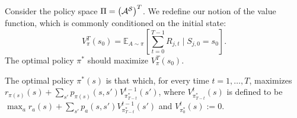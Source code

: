 \documentclass[11pt]{article}
\begin{document}
Consider the policy space $\Pi = \left(\mathcal{A}^{\mathcal{S}}\right)^{T}$. We redefine our notion of the value function, which is commonly conditioned on the initial state:
\begin{equation}
	\label{eq:valuefcn}
	V_{\pi}^{T}\left(s_{0}\right) = \mathbb{E}_{A\sim\pi}\left[\sum_{t=0}^{T-1} R_{j,t} \mid S_{j,0} = s_{0}\right].
\end{equation}
The optimal policy $\pi^{*}$ should maximize $V_{\pi}^{T}(s_{0})$.

\begin{proposition}
	The optimal policy $\pi^*(s)$ is that which, for every time $t=1,\ldots, T$, maximizes $r_{\pi(s)}(s) + \sum_{s'} p_{\pi(s)}(s,s') V_{\pi^*_{T-t}}^{t-1}(s')$, where $V_{\pi^*_{T-t}}^{t}(s)$ is defined to be $\max_{a} r_{a}(s) + \sum_{s'} p_{a}(s,s') V_{\pi^{*}_{T-t}}^{t-1}(s')$ and $V_{\pi^*_{0}}^{t}(s) := 0$.
\end{proposition}
\end{document}
